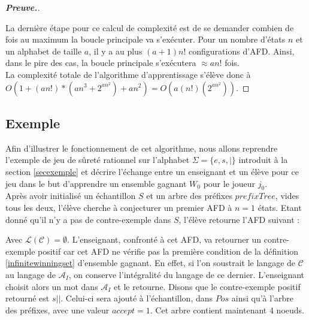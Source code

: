 \documentclass[12pt,a4paper,oneside,titlepage]{report}
\newenvironment{demonstration}{\begin{proof}[\textnormal{\textbf{Preuve.}}]}{\end{proof}}
\begin{document}
\begin{demonstration}
\begin{itemize}
\end{itemize}
La dernière étape pour ce calcul de complexité est de se demander combien de fois au maximum la boucle principale va s'exécuter. Pour un nombre d'états $n$ et un alphabet de taille $a$, il y a au plus $(a+1)n!$ configurations d'AFD. Ainsi, dans le pire des cas, la boucle principale s'exécutera $\approx an!$ fois. \\
La complexité totale de l'algorithme d'apprentissage s'élève donc à $O(1+(an!)*(an^3+2^{an^2})+an^2)=O(a(n!)(2^{an^2}))$.
\end{demonstration}
\subsection{Exemple}
Afin d'illustrer le fonctionnement de cet algorithme, nous allons reprendre l'exemple de jeu de sûreté rationnel sur l'alphabet $\Sigma=\{e,s,|\}$ introduit à la section \ref{secexemple} et décrire l'échange entre un enseignant et un élève pour ce jeu dans le but d'apprendre un ensemble gagnant $W_0$ pour le joueur $j_0$.\\

Après avoir initialisé un échantillon $S$ et un arbre des préfixes $prefixTree$, vides tous les deux, l'élève cherche à conjecturer un premier AFD à $n=1$ états. Etant donné qu'il n'y a pas de contre-exemple dans $S$, l'élève retourne l'AFD suivant :

\begin{figure}[H]
\centering
{}
\end{figure}
\noindent Avec $\mathcal{L}(\mathcal{C})=\emptyset$. L'enseignant, confronté à cet AFD, va retourner un contre-exemple positif car cet AFD ne vérifie pas la première condition de la définition \ref{infinitewinningset} d'ensemble gagnant. En effet, si l'on soustrait le langage de $\mathcal{C}$ au langage de $\mathcal{A}_I$, on conserve l'intégralité du langage de ce dernier. L'enseignant choisit alors un mot dans $\mathcal{A}_I$ et le retourne. Disons que le contre-exemple positif retourné est $s||$. Celui-ci sera ajouté à l'échantillon, dans $Pos$ ainsi qu'à l'arbre des préfixes, avec une valeur $accept=1$. Cet arbre contient maintenant 4 noeuds.\\
\end{document}
